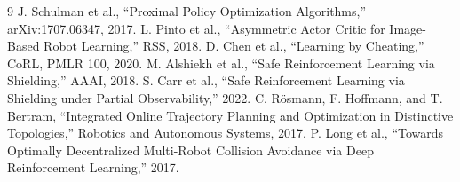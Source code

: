 \documentclass[12pt,a4paper,oneside]{report}
\begin{document}
\begin{thebibliography}{9}
 J. Schulman et al., ``Proximal Policy Optimization Algorithms,'' arXiv:1707.06347, 2017.
 L. Pinto et al., ``Asymmetric Actor Critic for Image-Based Robot Learning,'' RSS, 2018.
 D. Chen et al., ``Learning by Cheating,'' CoRL, PMLR 100, 2020.
 M. Alshiekh et al., ``Safe Reinforcement Learning via Shielding,'' AAAI, 2018.
 S. Carr et al., ``Safe Reinforcement Learning via Shielding under Partial Observability,'' 2022.
 C. Rösmann, F. Hoffmann, and T. Bertram, ``Integrated Online Trajectory Planning and Optimization in Distinctive Topologies,'' Robotics and Autonomous Systems, 2017.
 P. Long et al., ``Towards Optimally Decentralized Multi-Robot Collision Avoidance via Deep Reinforcement Learning,'' 2017.
\end{thebibliography}
\end{document}

